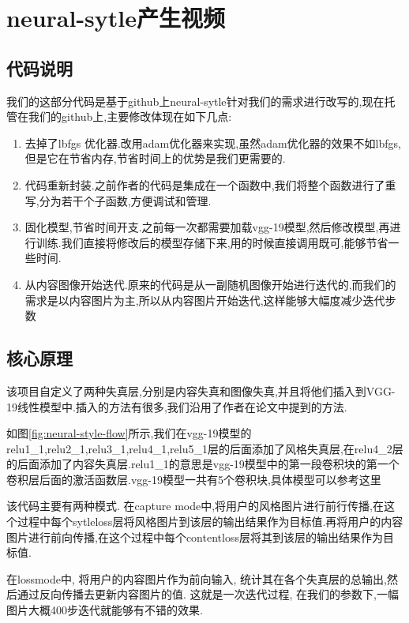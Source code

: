 \section{neural-sytle产生视频}
\subsection{代码说明}
我们的这部分代码是基于github上neural-sytle\cite{neural-style}针对我们的需求进行改写的,现在托管在我们的github\cite{neural-style-diy}上,主要修改体现在如下几点:
\begin{enumerate}
  \item 去掉了lbfgs 优化器.改用adam优化器来实现,虽然adam优化器的效果不如lbfgs,但是它在节省内存,节省时间上的优势是我们更需要的.
  \item 代码重新封装.之前作者的代码是集成在一个函数中,我们将整个函数进行了重写,分为若干个子函数,方便调试和管理.
  \item 固化模型,节省时间开支.之前每一次都需要加载vgg-19模型,然后修改模型,再进行训练.我们直接将修改后的模型存储下来,用的时候直接调用既可,能够节省一些时间.
  \item 从内容图像开始迭代.原来的代码是从一副随机图像开始进行迭代的,而我们的需求是以内容图片为主,所以从内容图片开始迭代,这样能够大幅度减少迭代步数
\end{enumerate}
\subsection{核心原理}
该项目自定义了两种失真层,分别是内容失真和图像失真,并且将他们插入到VGG-19线性模型中.插入的方法有很多,我们沿用了作者在论文中提到的方法\cite{article:neural-style}.

如图\ref{fig:neural-style-flow}所示,我们在vgg-19模型的relu1\_1,relu2\_1,relu3\_1,relu4\_1,relu5\_1层的后面添加了风格失真层,在relu4\_2层的后面添加了内容失真层.relu1\_1的意思是vgg-19模型中的第一段卷积块的第一个卷积层后面的激活函数层.vgg-19模型一共有5个卷积块,具体模型可以参考这里\cite{vgg-19}

该代码主要有两种模式. 在capture mode中,将用户的风格图片进行前行传播,在这个过程中每个sytleloss层将风格图片到该层的输出结果作为目标值.再将用户的内容图片进行前向传播,在这个过程中每个contentloss层将其到该层的输出结果作为目标值.

在lossmode中, 将用户的内容图片作为前向输入, 统计其在各个失真层的总输出,然后通过反向传播去更新内容图片的值.
这就是一次迭代过程, 在我们的参数下,一幅图片大概400步迭代就能够有不错的效果.

